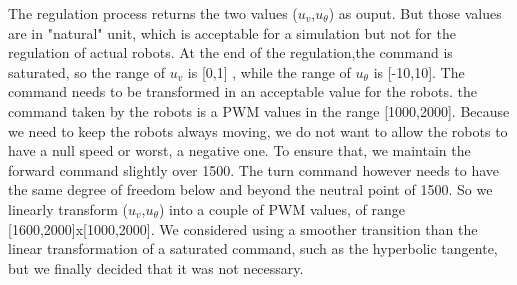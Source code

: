 The regulation process returns the two values ($u_v$,$u_{\theta}$) as ouput. But those values are in "natural" unit, which is acceptable for a simulation but not for the regulation of actual robots.
At the end of the regulation,the command is saturated, so the range of $u_v$ is [0,1] , while the range of $u_{\theta}$ is [-10,10].
The command needs to be transformed in an acceptable value for the robots.
the command taken by the robots is a PWM values in the range [1000,2000]. Because we need to keep the robots always moving, we do not want to allow the robots to have a null speed or worst, a negative one.
To ensure that, we maintain the forward command slightly over 1500. The turn command however needs to have the same degree of freedom below and beyond the neutral point of 1500.
So we linearly transform  ($u_v$,$u_{\theta}$) into a couple of PWM values, of range [1600,2000]x[1000,2000]. 
We considered using a smoother transition than the linear transformation of a saturated command, such as the hyperbolic tangente, but we finally decided that it was not necessary.
